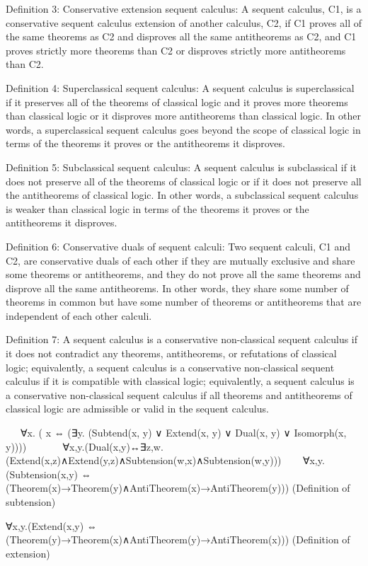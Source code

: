 Definition 3: Conservative extension sequent calculus:
A sequent calculus, C1, is a conservative sequent calculus extension of another calculus, C2, if C1 proves all of the same theorems as C2 and disproves all the same antitheorems as C2, and C1 proves strictly more theorems than C2 or disproves strictly more antitheorems than C2.

Definition 4: Superclassical sequent calculus:
A sequent calculus is superclassical if it preserves all of the theorems of classical logic and it proves more theorems than classical logic or it disproves more antitheorems than classical logic. In other words, a superclassical sequent calculus goes beyond the scope of classical logic in terms of the theorems it proves or the antitheorems it disproves.

Definition 5: Subclassical sequent calculus:
A sequent calculus is subclassical if it does not preserve all of the theorems of classical logic or if it does not preserve all the antitheorems of classical logic. In other words, a subclassical sequent calculus is weaker than classical logic in terms of the theorems it proves or the antitheorems it disproves.

Definition 6: Conservative duals of sequent calculi:
Two sequent calculi, C1 and C2, are conservative duals of each other if they are mutually exclusive and share some theorems or antitheorems, and they do not prove all the same theorems and disprove all the same antitheorems. In other words, they share some number of theorems in common but have some number of theorems or antitheorems that are independent of each other calculi.

Definition 7: A sequent calculus is a conservative non-classical sequent calculus if it does not contradict any theorems, antitheorems, or refutations of classical logic; equivalently, a sequent calculus is a conservative non-classical sequent calculus if it is compatible with classical logic; equivalently, a sequent calculus is a conservative non-classical sequent calculus if all theorems and antitheorems of classical logic are admissible or valid in the sequent calculus.

   ∀x. ( x ⇔ (∃y. (Subtend(x, y) ∨ Extend(x, y) ∨ Dual(x, y) ∨ Isomorph(x, y))))
   
   ∀x,y.(Dual(x,y)↔∃z,w.(Extend(x,z)∧Extend(y,z)∧Subtension(w,x)∧Subtension(w,y)))
   
∀x,y.(Subtension(x,y) ⇔ (Theorem(x)→Theorem(y)∧AntiTheorem(x)→AntiTheorem(y))) (Definition of subtension)

∀x,y.(Extend(x,y) ⇔ (Theorem(y)→Theorem(x)∧AntiTheorem(y)→AntiTheorem(x))) (Definition of extension)

